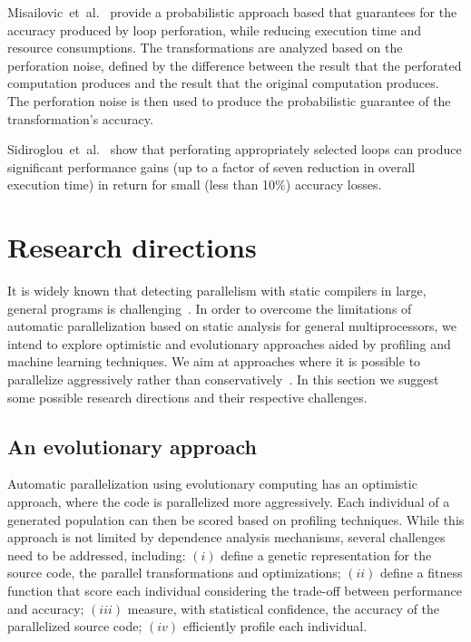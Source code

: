\documentclass[a4paper,12pt]{article}
\newcommand{\etal}{et~al.}
\begin{document}
Misailovic~\etal~\cite{misailovic11} provide a probabilistic approach based
that guarantees for the accuracy produced by loop perforation, while reducing
execution time and resource consumptions.  The transformations are analyzed
based on the perforation noise, defined by the difference between the result
that the perforated computation produces and the result that the original
computation produces. The perforation noise is then used to produce the
probabilistic guarantee of the transformation's accuracy.

Sidiroglou~\etal~\cite{douskos11} show that perforating appropriately selected
loops can produce significant performance gains (up to a factor of seven
reduction in overall execution time) in return for small (less than 10\%)
accuracy losses.

\section{Research directions}\label{sec:research-dir}

It is widely known that detecting parallelism with static compilers in large,
general programs is challenging~\cite{kennedy01,chen03}.  In order to overcome
the limitations of automatic parallelization based on static analysis for
general multiprocessors, we intend to explore optimistic and evolutionary
approaches aided by profiling and machine learning techniques.  We aim at
approaches where it is possible to parallelize aggressively rather than
conservatively~\cite{chen03,williams96,williams99}. In this section we suggest
some possible research directions and their respective challenges.

\subsection{An evolutionary approach}

Automatic parallelization using evolutionary computing has an optimistic
approach, where the code is parallelized more aggressively.  Each individual of
a generated population can then be scored based on profiling techniques.  While
this approach is not limited by dependence analysis mechanisms, several
challenges need to be addressed, including: $(i)$ define a genetic
representation for the source code, the parallel transformations and
optimizations; $(ii)$ define a fitness function that score each individual
considering the trade-off between performance and accuracy; $(iii)$ measure,
with statistical confidence, the accuracy of the parallelized source code;
$(iv)$ efficiently profile each individual.
\end{document}
